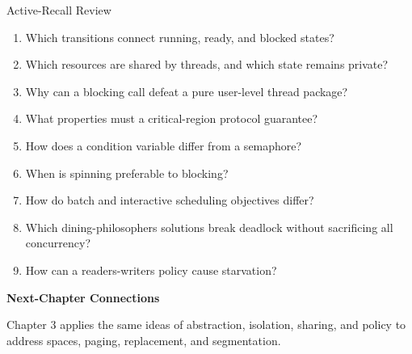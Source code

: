 \documentclass[10pt,letterpaper]{article}
\begin{document}
\enlargethispage{2\baselineskip}
\begin{studybox}{Active-Recall Review}
\small
\begin{enumerate}
  \item Which transitions connect running, ready, and blocked states?
  \item Which resources are shared by threads, and which state remains private?
  \item Why can a blocking call defeat a pure user-level thread package?
  \item What properties must a critical-region protocol guarantee?
  \item How does a condition variable differ from a semaphore?
  \item When is spinning preferable to blocking?
  \item How do batch and interactive scheduling objectives differ?
  \item Which dining-philosophers solutions break deadlock without sacrificing all concurrency?
  \item How can a readers-writers policy cause starvation?
\end{enumerate}
\end{studybox}

\par\medskip
{\color{navy}\bfseries Next-Chapter Connections}\par\smallskip
Chapter 3 applies the same ideas of abstraction, isolation, sharing, and policy to address spaces, paging, replacement, and segmentation.
\normalsize
\end{document}
